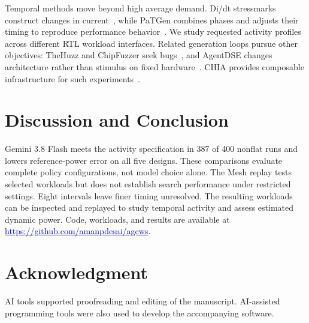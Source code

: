 \documentclass[conference]{IEEEtran}
\begin{document}
Temporal methods move beyond high average demand. Di/dt stressmarks construct
changes in current~\cite{kim,didt}, while PaTGen combines phases and adjusts
their timing to reproduce performance behavior~\cite{patgen}. We study requested
activity profiles across different RTL workload interfaces. Related generation
loops pursue other objectives: TheHuzz and ChipFuzzer seek bugs~\cite{thehuzz,chipfuzzer},
and AgentDSE changes architecture rather than stimulus on fixed hardware~\cite{agentdse}.
CHIA provides composable infrastructure for such experiments~\cite{chia}.

\section{Discussion and Conclusion}
Gemini 3.8 Flash meets the activity specification in 387 of 400 nonflat runs
and lowers reference-power error on all five designs. These comparisons evaluate
complete policy configurations, not model choice alone. The Mesh replay tests
selected workloads but does not establish search performance under restricted
settings. Eight intervals leave finer timing unresolved. The resulting workloads
can be inspected and replayed to study temporal activity and assess estimated
dynamic power.
Code, workloads, and results are available at
\href{https://github.com/amanpdesai/agcws}{\textcolor{blue}{\underline{https://github.com/amanpdesai/agcws}}}.

\section*{Acknowledgment}
AI tools supported proofreading and editing of the manuscript.
AI-assisted programming tools were also used to develop the accompanying software.



\end{document}
